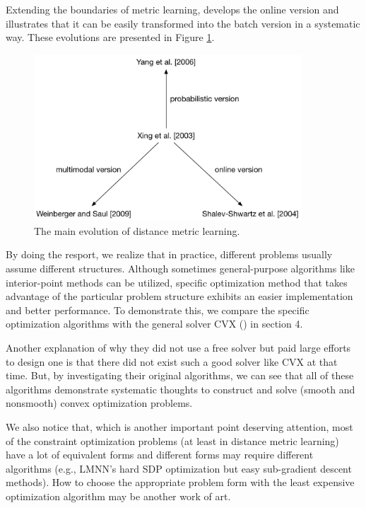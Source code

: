 \documentclass[12pt]{article}
\begin{document}
Extending the boundaries of metric learning, \cite{shalev2004online} develops the online version and illustrates that it can be easily transformed into the batch version in a systematic way. These evolutions are presented in Figure \ref{evol}.
\begin{figure}[h]
\centering
\includegraphics[width=10cm]{fig/evolution.jpg}
\caption{The main evolution of distance metric learning.}
\label{evol}
\end{figure}

By doing the resport, we realize that in practice, different problems usually assume different structures. Although sometimes general-purpose algorithms like interior-point methods can be utilized,  specific optimization method that takes advantage of the particular problem structure exhibits an easier implementation and better performance. To demonstrate this, we compare the specific optimization algorithms with the general solver CVX (\cite{grant2008cvx}) in section 4. 

Another explanation of why they did not use a free solver but paid large efforts to design one is that there did not exist such a  good solver like CVX  at that time. But, by investigating their original algorithms, we can see that all of these algorithms demonstrate systematic thoughts to construct and solve (smooth and nonsmooth) convex optimization problems. 

We also notice that, which is another important point deserving attention, most of the constraint optimization problems (at least in distance metric learning) have a lot of equivalent forms and different forms may require different algorithms (e.g., LMNN's hard SDP optimization but easy sub-gradient descent methods). How to choose the appropriate problem form with the least expensive optimization algorithm may be another work of art.
\end{document}
